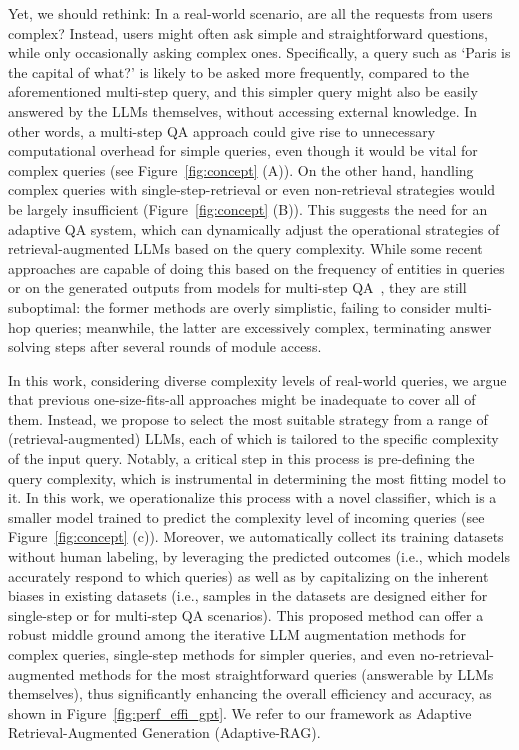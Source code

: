 Yet, we should rethink: In a real-world scenario, are all the requests from users complex? Instead, users might often ask simple and straightforward questions, while only occasionally asking complex ones. Specifically, a query such as `Paris is the capital of what?' is likely to be asked more frequently, compared to the aforementioned multi-step query, and this simpler query might also be easily answered by the LLMs themselves, without accessing external knowledge. In other words, a multi-step QA approach could give rise to unnecessary computational overhead for simple queries, even though it would be vital for complex queries (see Figure~\ref{fig:concept} (A)). On the other hand, handling complex queries with single-step-retrieval or even non-retrieval strategies would be largely insufficient (Figure~\ref{fig:concept} (B)). This suggests the need for an adaptive QA system, which can dynamically adjust the operational strategies of retrieval-augmented LLMs based on the query complexity. While some recent approaches are capable of doing this based on the frequency of entities in queries~\cite{adaptiveRetrieval} or on the generated outputs from models for multi-step QA~\cite{ircot}, they are still suboptimal: the former methods are overly simplistic, failing to consider multi-hop queries; meanwhile, the latter are excessively complex, terminating answer solving steps after several rounds of module access.


 
In this work, considering diverse complexity levels of real-world queries, we argue that previous one-size-fits-all approaches might be inadequate to cover all of them. Instead, we propose to select the most suitable strategy from a range of (retrieval-augmented) LLMs, each of which is tailored to the specific complexity of the input query. Notably, a critical step in this process is pre-defining the query complexity, which is instrumental in determining the most fitting model to it. In this work, we operationalize this process with a novel classifier, which is a smaller model trained to predict the complexity level of incoming queries (see Figure~\ref{fig:concept} (c)). Moreover, we automatically collect its training datasets without human labeling, by leveraging the predicted outcomes (i.e., which models accurately respond to which queries) as well as by capitalizing on the inherent biases in existing datasets (i.e., samples in the datasets are designed either for single-step or for multi-step QA scenarios). This proposed method can offer a robust middle ground among the iterative LLM augmentation methods for complex queries, single-step methods for simpler queries, and even no-retrieval-augmented methods for the most straightforward queries (answerable by LLMs themselves), thus significantly enhancing the overall efficiency and accuracy, as shown in Figure~\ref{fig:perf_effi_gpt}. We refer to our framework as Adaptive Retrieval-Augmented Generation (Adaptive-RAG).



